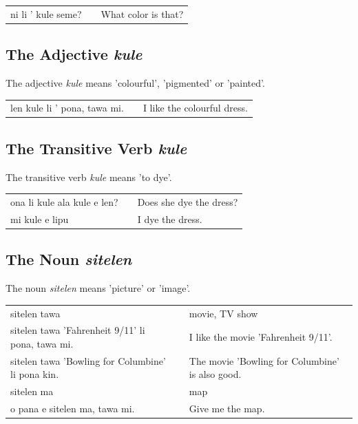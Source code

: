 \begin{supertabular}{p{5,5cm}|ll}
    ni li ' kule seme? &  & What color is that? \\
\end{supertabular}

%
\subsection*{The Adjective \textit{kule}}
%
%
The adjective \textit{kule} means 'colourful', 'pigmented' or 'painted'.

\begin{supertabular}{p{5,5cm}|ll}
    len kule li ' pona, tawa mi. &  & I like the colourful dress. \\
\end{supertabular}

%
\subsection*{The Transitive Verb \textit{kule}}
%
%
The transitive verb \textit{kule} means 'to dye'.

\begin{supertabular}{p{5,5cm}|ll}
    ona li kule ala kule e len? &  & Does she dye the dress? \\
    mi kule e lipu              &  & I dye the dress.        \\
\end{supertabular}

%
\subsection*{The Noun \textit{sitelen}}
%
%
The noun \textit{sitelen} means 'picture' or 'image'.

\begin{supertabular}{p{5,5cm}|ll}
    sitelen tawa                                      &  & movie, TV show                                  \\
    sitelen tawa 'Fahrenheit 9/11' li pona, tawa mi.  &  & I like the movie 'Fahrenheit 9/11'.             \\
    sitelen tawa 'Bowling for Columbine' li pona kin. &  & The movie 'Bowling for Columbine' is also good. \\
    sitelen ma                                        &  & map                                             \\
    o pana e sitelen ma, tawa mi.                     &  & Give me the map.                                \\
\end{supertabular}

